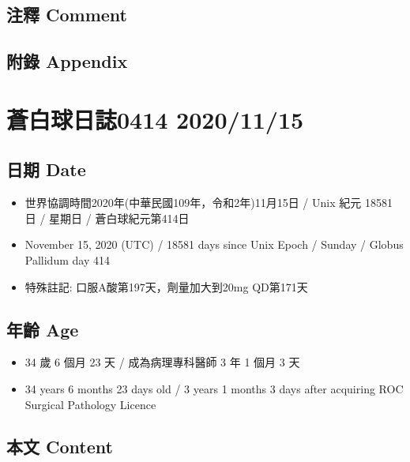 \documentclass[a5paper, 11pt
]{book}
\providecommand{\tightlist}{%
  \setlength{\itemsep}{0pt}\setlength{\parskip}{0pt}}
\begin{document}
\hypertarget{ux6ce8ux91cb-comment-68}{%
\subsection{注釋 Comment}\label{ux6ce8ux91cb-comment-68}}

\hypertarget{ux9644ux9304-appendix-68}{%
\subsection{附錄 Appendix}\label{ux9644ux9304-appendix-68}}

\hypertarget{ux84bcux767dux7403ux65e5ux8a8c0414-20201115}{%
\section{蒼白球日誌0414
2020/11/15}\label{ux84bcux767dux7403ux65e5ux8a8c0414-20201115}}

\hypertarget{ux65e5ux671f-date-69}{%
\subsection{日期 Date}\label{ux65e5ux671f-date-69}}

\begin{itemize}
\tightlist
\item
  世界協調時間2020年(中華民國109年，令和2年)11月15日 / Unix 紀元 18581
  日 / 星期日 / 蒼白球紀元第414日
\item
  November 15, 2020 (UTC) / 18581 days since Unix Epoch / Sunday /
  Globus Pallidum day 414
\item
  特殊註記: 口服A酸第197天，劑量加大到20mg QD第171天
\end{itemize}

\hypertarget{ux5e74ux9f61-age-69}{%
\subsection{年齡 Age}\label{ux5e74ux9f61-age-69}}

\begin{itemize}
\tightlist
\item
  34 歲 6 個月 23 天 / 成為病理專科醫師 3 年 1 個月 3 天
\item
  34 years 6 months 23 days old / 3 years 1 months 3 days after
  acquiring ROC Surgical Pathology Licence
\end{itemize}

\hypertarget{ux672cux6587-content-69}{%
\subsection{本文 Content}\label{ux672cux6587-content-69}}
\end{document}
